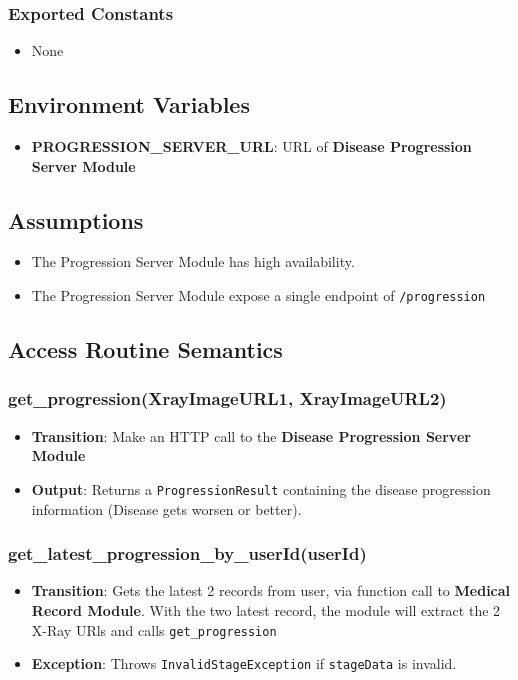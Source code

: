 \documentclass[12pt, titlepage]{article}
\begin{document}
\subsubsection{Exported Constants}
\begin{itemize}
    \item None
\end{itemize}

\subsection{Environment Variables}
\begin{itemize}
  \item \textbf{PROGRESSION\_SERVER\_URL}: URL of \textbf{Disease Progression Server Module}

\end{itemize}

\subsection{Assumptions}
\begin{itemize}
    \item The Progression Server Module has high availability. 
    \item The Progression Server Module expose a single endpoint of \texttt{/progression}
\end{itemize}
\subsection{Access Routine Semantics}

\subsubsection{get\_progression(XrayImageURL1, XrayImageURL2)}
\begin{itemize}
    \item \textbf{Transition}: Make an HTTP call to the \textbf{Disease Progression Server Module}
    \item \textbf{Output}: Returns a \texttt{ProgressionResult} containing the disease progression information (Disease gets worsen or better).
\end{itemize}

\subsubsection{get\_latest\_progression\_by\_userId(userId)}
\begin{itemize}
    \item \textbf{Transition}: Gets the latest 2 records from user, via function call to \textbf{Medical Record Module}. With the two latest record, the module will extract the 2 X-Ray URls and calls \texttt{get\_progression}
    \item \textbf{Exception}: Throws \texttt{InvalidStageException} if \texttt{stageData} is invalid.
\end{itemize}
\end{document}
